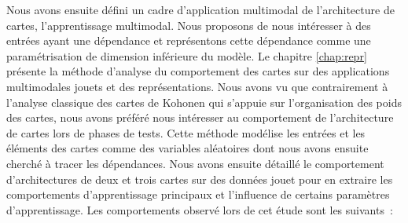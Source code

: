 Nous avons ensuite défini un cadre d'application multimodal de l'architecture de cartes, l'apprentissage multimodal. Nous proposons de nous intéresser à des entrées ayant une dépendance et représentons cette dépendance comme une paramétrisation de dimension inférieure du modèle.
Le chapitre \ref{chap:repr} présente la méthode d'analyse du comportement des cartes sur des applications multimodales jouets et des représentations. Nous avons vu que contrairement à l'analyse classique des cartes de Kohonen qui s'appuie sur l'organisation des poids des cartes, nous avons préféré nous intéresser au comportement de l'architecture de cartes lors de phases de tests. Cette méthode modélise les entrées et les éléments des cartes comme des variables aléatoires dont nous avons ensuite cherché à tracer les dépendances.
Nous avons ensuite détaillé le comportement d'architectures de deux et trois cartes sur des données jouet pour en extraire les comportements d'apprentissage principaux et l'influence de certains paramètres d'apprentissage.
Les comportements observé lors de cet étude sont les suivants~: 
